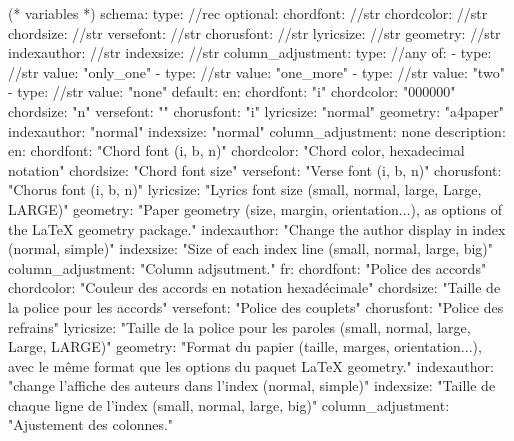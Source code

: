 %
%
%

(* variables *)
schema:
  type: //rec
  optional:
    chordfont: //str
    chordcolor: //str
    chordsize: //str
    versefont: //str
    chorusfont: //str
    lyricsize: //str
    geometry: //str
    indexauthor: //str
    indexsize: //str
    column_adjustment:
      type: //any
      of:
        - type: //str
          value: "only_one"
        - type: //str
          value: "one_more"
        - type: //str
          value: "two"
        - type: //str
          value: "none"
default:
  en:
    chordfont: "i"
    chordcolor: "000000"
    chordsize: "n"
    versefont: ""
    chorusfont: "i"
    lyricsize: "normal"
    geometry: "a4paper"
    indexauthor: "normal"
    indexsize: "normal"
    column_adjustment: none
description:
  en:
    chordfont: "Chord font (i, b, n)"
    chordcolor: "Chord color, hexadecimal notation"
    chordsize: "Chord font size"
    versefont: "Verse font (i, b, n)"
    chorusfont: "Chorus font (i, b, n)"
    lyricsize: "Lyrics font size (small, normal, large, Large, LARGE)"
    geometry: "Paper geometry (size, margin, orientation...), as options of the LaTeX geometry package."
    indexauthor: "Change the author display in index (normal, simple)"
    indexsize: "Size of each index line (small, normal, large, big)"
    column_adjustment: "Column adjsutment."
  fr:
    chordfont: "Police des accords"
    chordcolor: "Couleur des accords en notation hexadécimale"
    chordsize: "Taille de la police pour les accords"
    versefont: "Police des couplets"
    chorusfont: "Police des refrains"
    lyricsize: "Taille de la police pour les paroles (small, normal, large, Large, LARGE)"
    geometry: "Format du papier (taille, marges, orientation...), avec le même format que les options du paquet LaTeX geometry."
    indexauthor: "change l'affiche des auteurs dans l'index (normal, simple)"
    indexsize: "Taille de chaque ligne de l'index (small, normal, large, big)"
    column_adjustment: "Ajustement des colonnes."


